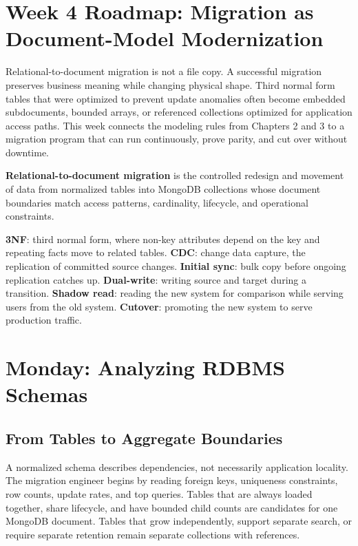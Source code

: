 \section{Week 4 Roadmap: Migration as Document-Model Modernization}
Relational-to-document migration is not a file copy. A successful migration preserves business meaning while changing physical shape. Third normal form tables that were optimized to prevent update anomalies often become embedded subdocuments, bounded arrays, or referenced collections optimized for application access paths. This week connects the modeling rules from Chapters 2 and 3 to a migration program that can run continuously, prove parity, and cut over without downtime.

\begin{definitionbox}
\textbf{Relational-to-document migration} is the controlled redesign and movement of data from normalized tables into MongoDB collections whose document boundaries match access patterns, cardinality, lifecycle, and operational constraints.
\end{definitionbox}

\begin{keyterms}
\textbf{3NF}: third normal form, where non-key attributes depend on the key and repeating facts move to related tables. \textbf{CDC}: change data capture, the replication of committed source changes. \textbf{Initial sync}: bulk copy before ongoing replication catches up. \textbf{Dual-write}: writing source and target during a transition. \textbf{Shadow read}: reading the new system for comparison while serving users from the old system. \textbf{Cutover}: promoting the new system to serve production traffic.
\end{keyterms}

\section{Monday: Analyzing RDBMS Schemas}
\subsection{From Tables to Aggregate Boundaries}
A normalized schema describes dependencies, not necessarily application locality. The migration engineer begins by reading foreign keys, uniqueness constraints, row counts, update rates, and top queries. Tables that are always loaded together, share lifecycle, and have bounded child counts are candidates for one MongoDB document. Tables that grow independently, support separate search, or require separate retention remain separate collections with references.

